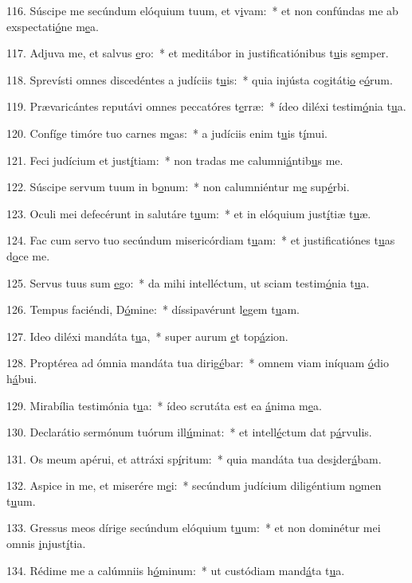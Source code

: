 116. Súscipe me secúndum elóquium tuum, et v\uline{i}vam:~* et non confúndas me ab exspectati\uline{ó}ne m\uline{e}a.\par 
117. Adjuva me, et salvus \uline{e}ro:~* et meditábor in justificatiónibus t\uline{u}is s\uline{e}mper.\par 
118. Sprevísti omnes discedéntes a judíciis t\uline{u}is:~* quia injústa cogitáti\uline{o} e\uline{ó}rum.\par 
119. Prævaricántes reputávi omnes peccatóres t\uline{e}rræ:~* ídeo diléxi testim\uline{ó}nia t\uline{u}a.\par 
120. Confíge timóre tuo carnes m\uline{e}as:~* a judíciis enim t\uline{u}is t\uline{í}mui.\par 
121. Feci judícium et just\uline{í}tiam:~* non tradas me calumni\uline{á}ntib\uline{u}s me.\par 
122. Súscipe servum tuum in b\uline{o}num:~* non calumniéntur m\uline{e} sup\uline{é}rbi.\par 
123. Oculi mei defecérunt in salutáre t\uline{u}um:~* et in elóquium just\uline{í}tiæ t\uline{u}æ.\par 
124. Fac cum servo tuo secúndum misericórdiam t\uline{u}am:~* et justificatiónes t\uline{u}as d\uline{o}ce me.\par 
125. Servus tuus sum \uline{e}go:~* da mihi intelléctum, ut sciam testim\uline{ó}nia t\uline{u}a.\par 
126. Tempus faciéndi, D\uline{ó}mine:~* díssipavérunt l\uline{e}gem t\uline{u}am.\par 
127. Ideo diléxi mandáta t\uline{u}a,~* super aurum \uline{e}t top\uline{á}zion.\par 
128. Proptérea ad ómnia mandáta tua dirig\uline{é}bar:~* omnem viam iníquam \uline{ó}dio h\uline{á}bui.\par 
129. Mirabília testimónia t\uline{u}a:~* ídeo scrutáta est ea \uline{á}nima m\uline{e}a.\par 
130. Declarátio sermónum tuórum ill\uline{ú}minat:~* et intell\uline{é}ctum dat p\uline{á}rvulis.\par 
131. Os meum apérui, et attráxi sp\uline{í}ritum:~* quia mandáta tua des\uline{i}der\uline{á}bam.\par 
132. Aspice in me, et miserére m\uline{e}i:~* secúndum judícium diligéntium n\uline{o}men t\uline{u}um.\par 
133. Gressus meos dírige secúndum elóquium t\uline{u}um:~* et non dominétur mei omnis \uline{i}njust\uline{í}tia.\par 
134. Rédime me a calúmniis h\uline{ó}minum:~* ut custódiam mand\uline{á}ta t\uline{u}a.\par 
